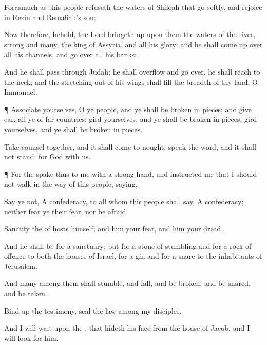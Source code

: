 {Forasmuch as this
people
refuseth the
waters of
Shiloah that
go
softly, and
rejoice in
Rezin and
Remaliah’s
son;

Now therefore, behold, the
Lord bringeth
up upon them the
waters of the
river,
strong and
many,
{} the
king of
Assyria, and all his
glory: and he shall come
up over all his
channels, and go
over all his
banks:

And he shall
pass through
Judah; he shall
overflow and go
over, he shall
reach
{} to the
neck; and the stretching
out of his
wings shall
fill the
breadth of thy
land, O
Immanuel.


\par }{\PP {}¶
Associate yourselves, O ye
people, and ye shall be broken in
pieces; and give
ear,
all ye of
far
countries:
gird yourselves, and ye shall be broken in
pieces;
gird yourselves, and ye shall be broken in
pieces.

Take
counsel
together, and it shall come to
nought;
speak the
word, and it shall not
stand: for
God
{} with us.


\par }{\PP {}¶ For the
{}
spake thus to me with a
strong
hand, and
instructed me that I should not
walk in the
way of this
people,
saying,

Say ye not, A
confederacy, to all
{} whom this
people shall
say, A
confederacy; neither
fear ye their
fear, nor be
afraid.

Sanctify the
{} of
hosts himself; and
{} him
{} your
fear, and
{} him
{} your
dread.

And he shall be for a
sanctuary; but for a
stone of
stumbling and for a
rock of
offence to
both the
houses of
Israel, for a
gin and for a
snare to the
inhabitants of
Jerusalem.

And
many among them shall
stumble, and
fall, and be
broken, and be
snared, and be
taken.


\par }{\PP {}Bind
up the
testimony,
seal the
law among my
disciples.

And I will
wait upon the
{}, that
hideth his
face from the
house of
Jacob, and I will
look for him.

}
